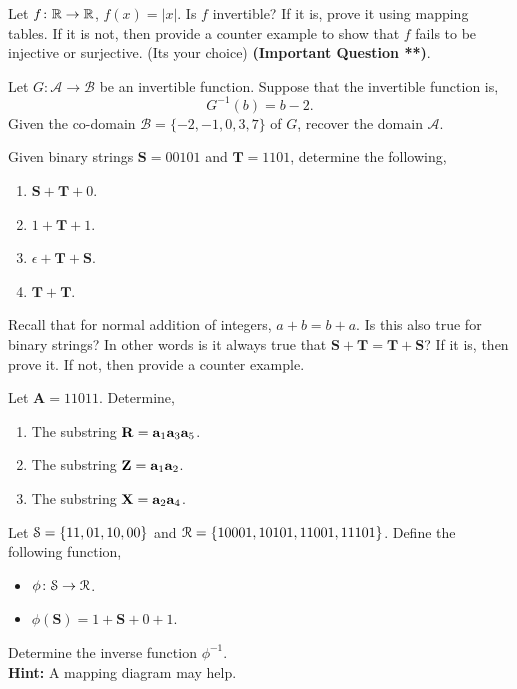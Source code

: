 \documentclass[12pt]{article} %
\begin{document}
\begin{qstn}
  Let $f \colon \mathbb R \to \mathbb R$,  $f(x) = \left|x\right|$. Is $f$ invertible? If it is, prove it using mapping tables.
  If it is not, then provide a counter example to show that $f$ fails to be injective or surjective. (Its your choice)
  \textbf{(Important Question **)}.
\end{qstn}

\newpage

\begin{qstn}
  Let $G \colon \mathcal{A} \to \mathcal{B}$ be an invertible function. Suppose that the invertible function is,
  \[
      G^{-1}(b) = b - 2
  .\] 
  Given the co-domain $\mathcal{B} = \{-2,-1,0,3,7\} $ of $G$, recover the domain $\mathcal{A}$.
\end{qstn}


\begin{qstn}
  Given binary strings $\mathbf{S} = 00101$ and $\mathbf{T} = 1101$, determine the following,
  \begin{enumerate}[label=(\alph*)]
    \item $\mathbf{S} + \mathbf{T} + 0$.
    \item $1 + \mathbf{T} + 1$.
    \item $\epsilon + \mathbf{T} + \mathbf{S}$.
    \item $\mathbf{T} + \mathbf{T}$.
  \end{enumerate}
\end{qstn}

\begin{qstn}
  Recall that for normal addition of integers, $a + b = b + a$. Is this also true for binary strings? In other words is
  it always true that $\mathbf{S} + \mathbf{T} = \mathbf{T} + \mathbf{S}$? If it is, then prove it. If not, 
  then provide a counter example. 
\end{qstn}

\begin{qstn}
  Let $\mathbf{A} = 11011$. Determine,
  \begin{enumerate}[label=(\alph*)]
    \item The substring $\mathbf{R} = \vb a_1\vb a_3\vb a_5$.
    \item The substring $\mathbf{Z} = \vb a_1\vb a_2$.
    \item The substring $\mathbf{X} = \vb a_2\vb a_4$.
  \end{enumerate}
\end{qstn}

\begin{qstn}
Let $\EuScript{S} = \{11, 01, 10, 00\}$ and $\EuScript{R} = \{10001, 10101,11001,11101\} $. Define the following function,
  \begin{itemize}
    \item $\phi \colon \EuScript{S} \to \EuScript{R}$. 
    \item $\phi(\mathbf{S}) = 1 + \mathbf{S} + 0 + 1$.
  \end{itemize}
  Determine the inverse function $\phi^{-1}$.\\
  \textbf{Hint:} A mapping diagram may help.
\end{qstn}
\end{document}
